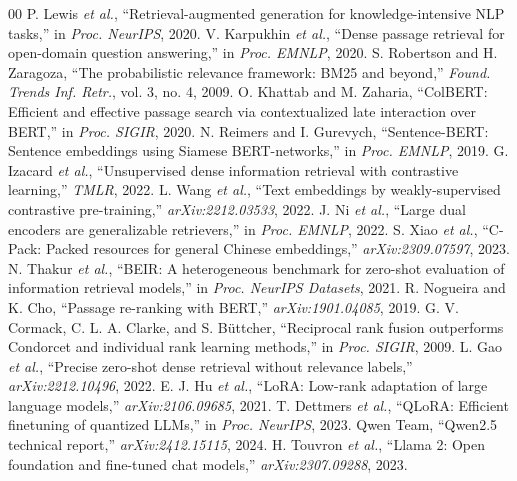 \documentclass[conference]{IEEEtran}
\begin{document}
\begin{thebibliography}{00}
 P. Lewis \textit{et al.}, ``Retrieval-augmented generation for knowledge-intensive NLP tasks,'' in \textit{Proc. NeurIPS}, 2020.
 V. Karpukhin \textit{et al.}, ``Dense passage retrieval for open-domain question answering,'' in \textit{Proc. EMNLP}, 2020.
 S. Robertson and H. Zaragoza, ``The probabilistic relevance framework: BM25 and beyond,'' \textit{Found. Trends Inf. Retr.}, vol. 3, no. 4, 2009.
 O. Khattab and M. Zaharia, ``ColBERT: Efficient and effective passage search via contextualized late interaction over BERT,'' in \textit{Proc. SIGIR}, 2020.
 N. Reimers and I. Gurevych, ``Sentence-BERT: Sentence embeddings using Siamese BERT-networks,'' in \textit{Proc. EMNLP}, 2019.
 G. Izacard \textit{et al.}, ``Unsupervised dense information retrieval with contrastive learning,'' \textit{TMLR}, 2022.
 L. Wang \textit{et al.}, ``Text embeddings by weakly-supervised contrastive pre-training,'' \textit{arXiv:2212.03533}, 2022.
 J. Ni \textit{et al.}, ``Large dual encoders are generalizable retrievers,'' in \textit{Proc. EMNLP}, 2022.
 S. Xiao \textit{et al.}, ``C-Pack: Packed resources for general Chinese embeddings,'' \textit{arXiv:2309.07597}, 2023.
 N. Thakur \textit{et al.}, ``BEIR: A heterogeneous benchmark for zero-shot evaluation of information retrieval models,'' in \textit{Proc. NeurIPS Datasets}, 2021.
 R. Nogueira and K. Cho, ``Passage re-ranking with BERT,'' \textit{arXiv:1901.04085}, 2019.
 G. V. Cormack, C. L. A. Clarke, and S. B\"uttcher, ``Reciprocal rank fusion outperforms Condorcet and individual rank learning methods,'' in \textit{Proc. SIGIR}, 2009.
 L. Gao \textit{et al.}, ``Precise zero-shot dense retrieval without relevance labels,'' \textit{arXiv:2212.10496}, 2022.
 E. J. Hu \textit{et al.}, ``LoRA: Low-rank adaptation of large language models,'' \textit{arXiv:2106.09685}, 2021.
 T. Dettmers \textit{et al.}, ``QLoRA: Efficient finetuning of quantized LLMs,'' in \textit{Proc. NeurIPS}, 2023.
 Qwen Team, ``Qwen2.5 technical report,'' \textit{arXiv:2412.15115}, 2024.
 H. Touvron \textit{et al.}, ``Llama 2: Open foundation and fine-tuned chat models,'' \textit{arXiv:2307.09288}, 2023.

\end{thebibliography}
\end{document}
